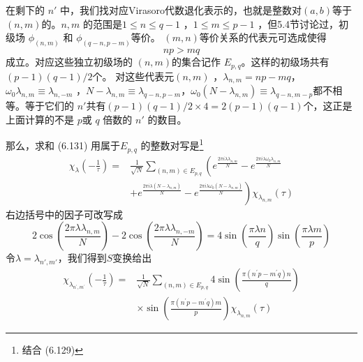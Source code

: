 在剩下的 $n'$ 中，我们找对应Virasoro代数退化表示的，也就是整数对$(a,b) $等于$ (n,m) $的。$ n,m$ 的范围是$ 1 \leq n \leq q-1$ ，$ 1 \leq m \leq p-1$ ，但5.4节讨论过，初级场 $\phi_{(n, m)}$ 和 $\phi_{(q-n, p-m)} $等价。 $(m,n) $等价关系的代表元可选成使得
\begin{equation}
	n p>m q
\end{equation} 
成立。对应这些独立初级场的 $(n,m) $的集合记作 $E_{p, q} $。这样的初级场共有 $(p-1)(q-1) / 2 $个。
对这些代表元$ (n,m)$ ，$ \lambda_{n, m}=n p-m q $，$ \omega_{0} \lambda_{n, m} \equiv \lambda_{n,-m}$ ，$ N-\lambda_{n,m}\equiv \lambda_{q-n,p-m} $，$ \omega_0(N-\lambda_{n,m})\equiv \lambda_{q-n,m-p} $都不相等。等于它们的 $n' $共有$ (p-1)(q-1) / 2 \times 4=2(p-1)(q-1) $个，这正是上面计算的不是 $p $或 $q$ 倍数的 $n'$ 的数目。

那么，求和 (6.131) 用属于$ E_{p, q}$ 的整数对写是\footnote{结合 (6.129)}
\begin{equation}
	\begin{aligned} \chi_{\lambda}\left(-\frac{1}{\tau}\right)=& \frac{1}{\sqrt{N}} \sum_{(n, m) \in E_{p, q}}\left(e^{\frac{2 \pi i \lambda \lambda_{n, m}}{N}}-e^{\frac{2 \pi i \lambda \omega_{0} \lambda_{n, m}}{N}}\right.\\&\left.+e^{\frac{2 \pi i \lambda\left(N-\lambda_{n, m}\right)}{N}}-e^{\frac{2 \pi i \lambda \omega_{0}\left(N-\lambda_{n, m}\right)}{N}}\right) \chi_{\lambda_{n, m}}(\tau) \end{aligned} 
\end{equation}
右边括号中的因子可改写成
\begin{equation}
	2 \cos \left(\frac{2 \pi \lambda \lambda_{n, m}}{N}\right)-2 \cos \left(\frac{2 \pi \lambda \lambda_{n,-m}}{N}\right)=4 \sin \left(\frac{\pi \lambda n}{q}\right) \sin \left(\frac{\pi \lambda m}{p}\right)
\end{equation} 
令$ \lambda=\lambda_{n', m'} $，我们得到$ S $变换给出
\begin{equation}
	\begin{aligned} \chi_{\lambda_{n^{\prime}, m^{\prime}}}\left(-\frac{1}{\tau}\right)=& \frac{1}{\sqrt{N}} \sum_{(n, m) \in E_{p, q}} 4 \sin \left(\frac{\pi\left(n^{\prime} p-m^{\prime} q\right) n}{q}\right) \\ & \times \sin \left(\frac{\pi\left(n^{\prime} p-m^{\prime} q\right) m}{p}\right) \chi_{\lambda_{n, m}}(\tau) \end{aligned} 
\end{equation}


